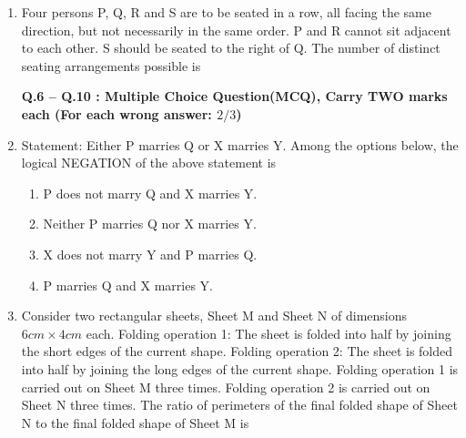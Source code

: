 \documentclass[journal,12pt,onecolumn]{IEEEtran}
\theoremstyle{remark}
\begin{document}
\begin{enumerate}
\item Four persons P, Q, R and S are to be seated in a row, all facing the same direction, but not necessarily in the same order. P and R cannot sit adjacent to each other. S should be seated to the right of Q. The number of distinct seating arrangements possible is
\par \hfill{}
\begin{enumerate}
\end{enumerate}

\textbf{Q.6 -- Q.10 : Multiple Choice Question(MCQ), Carry TWO marks each (For each wrong answer: ${2/}{3}$)}

\item Statement: Either P marries Q or X marries Y.  
Among the options below, the logical NEGATION of the above statement is
\par \hfill{}
\begin{enumerate}
  \item P does not marry Q and X marries Y.
  \item Neither P marries Q nor X marries Y.
  \item X does not marry Y and P marries Q.
  \item P marries Q and X marries Y.
\end{enumerate}

\item Consider two rectangular sheets, Sheet M and Sheet N of dimensions $6 cm \times 4 cm$ each.  
Folding operation 1: The sheet is folded into half by joining the short edges of the current shape.  
Folding operation 2: The sheet is folded into half by joining the long edges of the current shape.  
Folding operation 1 is carried out on Sheet M three times.  
Folding operation 2 is carried out on Sheet N three times.  
The ratio of perimeters of the final folded shape of Sheet N to the final folded shape of Sheet M is
\par \hfill{}
\begin{enumerate}
\end{enumerate}


\end{enumerate}
\end{document}

